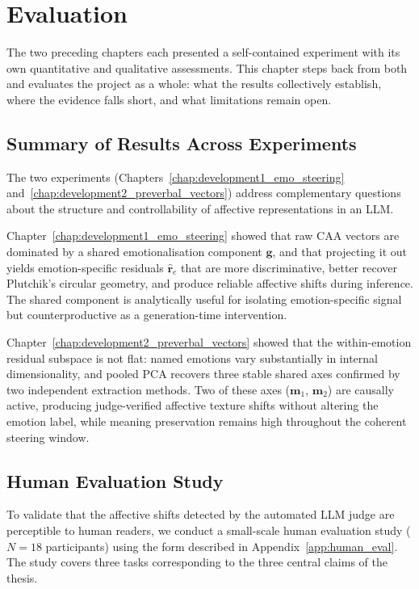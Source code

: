 \chapter{Evaluation}
\label{chap:evaluation}

The two preceding chapters each presented a self-contained experiment with its own quantitative and qualitative assessments. This chapter steps back from both and evaluates the project as a whole: what the results collectively establish, where the evidence falls short, and what limitations remain open.

\section{Summary of Results Across Experiments}

The two experiments (Chapters~\ref{chap:development1_emo_steering} and~\ref{chap:development2_preverbal_vectors}) address complementary questions about the structure and controllability of affective representations in an LLM.\par

Chapter~\ref{chap:development1_emo_steering} showed that raw CAA vectors are dominated by a shared emotionalisation component $\mathbf{g}$, and that projecting it out yields emotion-specific residuals $\hat{\mathbf{r}}_e$ that are more discriminative, better recover Plutchik's circular geometry, and produce reliable affective shifts during inference. The shared component is analytically useful for isolating emotion-specific signal but counterproductive as a generation-time intervention.\par

Chapter~\ref{chap:development2_preverbal_vectors} showed that the within-emotion residual subspace is not flat: named emotions vary substantially in internal dimensionality, and pooled PCA recovers three stable shared axes confirmed by two independent extraction methods. Two of these axes ($\mathbf{m}_1$, $\mathbf{m}_2$) are causally active, producing judge-verified affective texture shifts without altering the emotion label, while meaning preservation remains high throughout the coherent steering window.\par


\section{Human Evaluation Study}
\label{sec:eval-human}

To validate that the affective shifts detected by the automated LLM judge are perceptible to human readers, we conduct a small-scale human evaluation study ($N=18$ participants) using the form described in Appendix~\ref{app:human_eval}. The study covers three tasks corresponding to the three central claims of the thesis.

